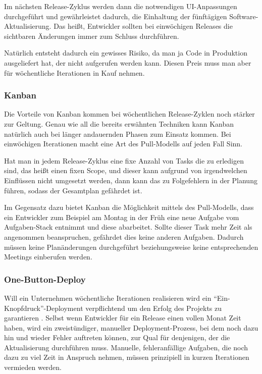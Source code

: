 Im nächsten Release-Zyklus werden dann die notwendigen UI-Anpassungen durchgeführt und gewährleistet dadurch, die Einhaltung der fünftägigen Software-Aktualisierung. Das heißt, Entwickler sollten bei einwöchigen Releases die sichtbaren Änderungen immer zum Schluss durchführen.

Natürlich entsteht dadurch ein gewisses Risiko, da man ja Code in Produktion ausgeliefert hat, der nicht aufgerufen werden kann. Diesen Preis muss man aber für wöchentliche Iterationen in Kauf nehmen.

\subsubsection{Kanban}
Die Vorteile von Kanban \cite{Boeg2011} kommen bei wöchentlichen Release-Zyklen noch stärker zur Geltung. Genau wie all die bereits erwähnten Techniken kann Kanban natürlich auch bei länger andauernden Phasen zum Einsatz kommen. Bei einwöchigen Iterationen macht eine Art des Pull-Modells auf jeden Fall Sinn. 

Hat man in jedem Release-Zyklus eine fixe Anzahl von Tasks die zu erledigen sind, das heißt einen fixen Scope, und dieser kann aufgrund von irgendwelchen Einflüssen nicht umgesetzt werden, dann kann das zu Folgefehlern in der Planung führen, sodass der Gesamtplan gefährdet ist. 

Im Gegensatz dazu bietet Kanban die Möglichkeit mittels des Pull-Modells, dass ein Entwickler zum Beispiel am Montag in der Früh eine neue Aufgabe vom Aufgaben-Stack entnimmt und diese abarbeitet. Sollte dieser Task mehr Zeit als angenommen beanspruchen, gefährdet dies keine anderen Aufgaben. Dadurch müssen keine Planänderungen durchgeführt beziehungsweise keine entsprechenden Meetings einberufen werden.

\subsubsection{One-Button-Deploy}
Will ein Unternehmen wöchentliche Iterationen realisieren wird ein \enquote{Ein-Knopfdruck}-Deployment verpflichtend um den Erfolg des Projekts zu garantieren \cite{humble2010continuous}. Selbst wenn Entwickler für ein Release einen vollen Monat Zeit haben, wird ein zweistündiger, manueller Deployment-Prozess, bei dem noch dazu hin und wieder Fehler auftreten können, zur Qual für denjenigen, der die Aktualisierung durchführen muss. Manuelle, fehleranfällige Aufgaben, die noch dazu zu viel Zeit in Anspruch nehmen, müssen prinzipiell in kurzen Iterationen vermieden werden.

